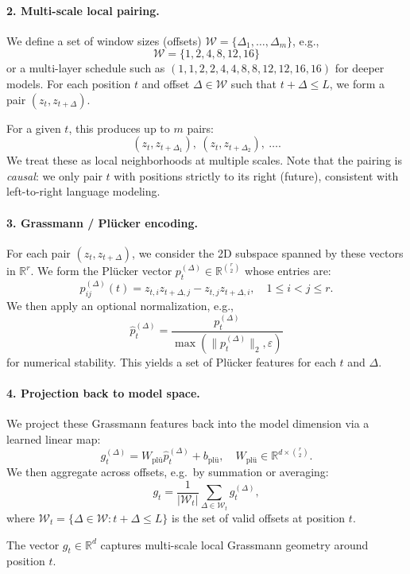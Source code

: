 \documentclass[11pt]{article}
\begin{document}
\paragraph{2. Multi-scale local pairing.}
We define a set of window sizes (offsets) $\mathcal{W} = \{\Delta_1, \dots, \Delta_m\}$, e.g.,
\[
\mathcal{W} = \{1,2,4,8,12,16\}
\]
or a multi-layer schedule such as $(1,1,2,2,4,4,8,8,12,12,16,16)$ for deeper models. For each position $t$ and offset $\Delta \in \mathcal{W}$ such that $t + \Delta \le L$, we form a pair $(z_t, z_{t+\Delta})$.

For a given $t$, this produces up to $m$ pairs:
\[
(z_t, z_{t+\Delta_1}),\ (z_t, z_{t+\Delta_2}),\ \dots.
\]
We treat these as local neighborhoods at multiple scales. Note that the pairing is \emph{causal}: we only pair $t$ with positions strictly to its right (future), consistent with left-to-right language modeling.

\paragraph{3. Grassmann / Pl\"ucker encoding.}
For each pair $(z_t, z_{t+\Delta})$, we consider the 2D subspace spanned by these vectors in $\mathbb{R}^r$. We form the Pl\"ucker vector $p_t^{(\Delta)} \in \mathbb{R}^{\binom{r}{2}}$ whose entries are:
\[
p_{ij}^{(\Delta)}(t) = z_{t,i} z_{t+\Delta,j} - z_{t,j} z_{t+\Delta,i},\quad 1 \le i < j \le r.
\]
We then apply an optional normalization, e.g.,
\[
\hat{p}_t^{(\Delta)} = \frac{p_t^{(\Delta)}}{\max(\|p_t^{(\Delta)}\|_2, \varepsilon)}
\]
for numerical stability. This yields a set of Pl\"ucker features for each $t$ and $\Delta$.

\paragraph{4. Projection back to model space.}
We project these Grassmann features back into the model dimension via a learned linear map:
\[
g_t^{(\Delta)} = W_{\text{pl\"u}} \hat{p}_t^{(\Delta)} + b_{\text{pl\"u}},\quad W_{\text{pl\"u}} \in \mathbb{R}^{d \times \binom{r}{2}}.
\]
We then aggregate across offsets, e.g.\ by summation or averaging:
\[
g_t = \frac{1}{|\mathcal{W}_t|} \sum_{\Delta \in \mathcal{W}_t} g_t^{(\Delta)},
\]
where $\mathcal{W}_t = \{\Delta \in \mathcal{W} : t+\Delta \le L\}$ is the set of valid offsets at position $t$.

The vector $g_t \in \mathbb{R}^d$ captures multi-scale local Grassmann geometry around position $t$.
\end{document}
